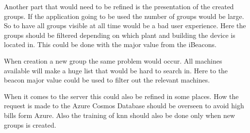 \bigskip

Another part that would need to be refined is the presentation of the created groups.
If the application going to be used the number of groups would be large.
So to have all groups visible at all time would be a bad user experience.
Here the groups should be filtered depending on which plant and building the device is located in.
This could be done with the major value from the iBeacons.

\bigskip

When creation a new group the same problem would occur.
All machines available will make a huge list that would be hard to search in.
Here to the beacon major value could be used to filter out the relevant machines.

\bigskip

When it comes to the server this could also be refined in some places.
How the request is made to the Azure Cosmos Database should be overseen to avoid high bills form Azure.
Also the training of \acrfull{knn} should also be done only when new groups is created.
